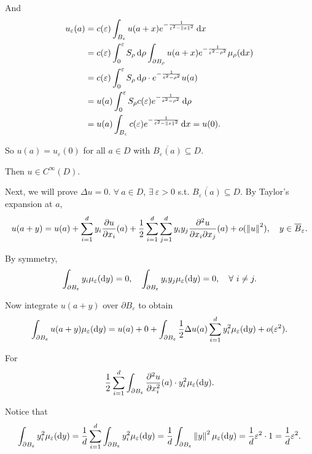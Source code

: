 {    And
    $$
    \begin{aligned}
    u_{\varepsilon}(a) &= c(\varepsilon)\int_{B_\varepsilon}u(a+x)e^{-\frac{1}{\varepsilon^2 - \left\|  x  \right\|^2}}\mathop{}\!\mathrm{d} x \\
    &=c(\varepsilon)\int_0^\varepsilon S_{\rho}\mathop{}\!\mathrm{d} \rho \int_{\partial B_{\rho}} u(a+x) e^{-\frac{1}{\varepsilon^2 - \rho^2}} \mu_\rho(\mathop{}\!\mathrm{d} x)\\
    &=c(\varepsilon)\int_0^\varepsilon S_{\rho}\mathop{}\!\mathrm{d} \rho \cdot e^{-\frac{1}{\varepsilon^2 - \rho^2}} u (a) \\
    &=u(a)\int_0^\varepsilon S_{\rho}c(\varepsilon)e^{-\frac{1}{\varepsilon^2 -\rho^2}}\mathop{}\!\mathrm{d} \rho \\
    &= u(a)\int_{B_\varepsilon}c(\varepsilon)e^{-\frac{1}{\varepsilon^2 - \left\|  x  \right\|^2}}\mathop{}\!\mathrm{d} x = u(0).
    \end{aligned}
    $$
    
    So $u(a) = u_{\varepsilon}(0)$ for all $a \in D$ with $\overline{B_\varepsilon(a)} \subseteq D$.

    Then $u \in C^\infty(D)$.

    Next, we will prove $\Delta u = 0$. $\forall~ a \in D$, $\exists~\varepsilon>0$ s.t. $\overline{B_\varepsilon(a)} \subseteq D$. By Taylor's expansion at $a$,
    $$
    u(a+y) = u(a) + \sum_{i=1}^d y_i \frac{\partial u}{\partial x_i}(a) + \frac{1}{2}\sum_{i=1}^d \sum_{j=1}^d y_i y_j \frac{\partial ^2 u}{\partial x_i \partial x_j}(a) + o(\left\|  u  \right\|^2), \quad y\in \overline{B}_\varepsilon.
    $$

    By symmetry, 
    $$\int_{\partial B_\varepsilon} y_i \mu_{\varepsilon}(\mathop{}\!\mathrm{d} y) = 0, \quad \int_{\partial B_\varepsilon} y_i y_j \mu_\varepsilon(\mathop{}\!\mathrm{d} y) = 0,\quad \forall~i \neq j.
    $$

    Now integrate $u(a+y)$ over $\partial B_\varepsilon$ to obtain
    $$
    \int_{\partial B_\varepsilon} u(a+y) \mu_\varepsilon (\mathop{}\!\mathrm{d} y) = u(a) + 0 + \int_{\partial B_\varepsilon} \frac{1}{2}\Delta u(a)\sum_{i=1}^d y_i^2 \mu_\varepsilon (\mathop{}\!\mathrm{d}  y) + o(\varepsilon^2).
    $$
    
    For 
    $$
    \frac{1}{2} \sum_{i=1}^d \int_{\partial B_\varepsilon} \frac{\partial ^2 u}{\partial x_i^2}(a) \cdot y_i^2 \mu_\varepsilon(\mathop{}\!\mathrm{d} y).
    $$

    Notice that
    $$
    \int_{\partial B_\varepsilon} y_i^2 \mu_\varepsilon(\mathop{}\!\mathrm{d}  y) = \frac{1}{d} \sum_{i=1}^d \int_{\partial B_\varepsilon} y_i^2 \mu_\varepsilon(\mathop{}\!\mathrm{d} y) = \frac{1}{d} \int_{\partial B_\varepsilon}\left\|  y  \right\|^2 \mu_\varepsilon(\mathop{}\!\mathrm{d}  y) = \frac{1}{d}\varepsilon^2 \cdot 1 = \frac{1}{d}\varepsilon^2.
    $$

}
